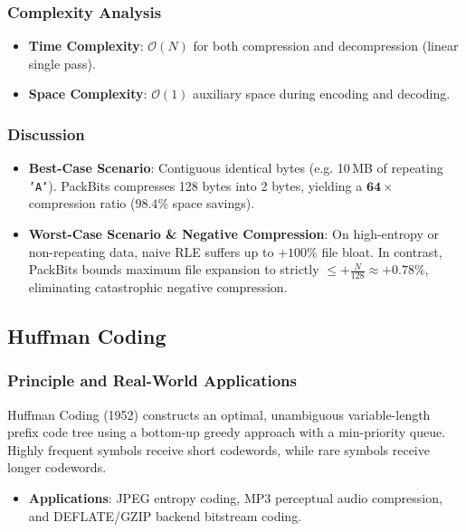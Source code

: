 \documentclass[12pt,a4paper]{article}
\begin{document}
\subsubsection{Complexity Analysis}
\begin{itemize}
    \item \textbf{Time Complexity}: $\mathcal{O}(N)$ for both compression and decompression (linear single pass).
    \item \textbf{Space Complexity}: $\mathcal{O}(1)$ auxiliary space during encoding and decoding.
\end{itemize}

\subsubsection{Discussion}
\begin{itemize}
    \item \textbf{Best-Case Scenario}: Contiguous identical bytes (e.g. 10\,MB of repeating \texttt{'A'}). PackBits compresses 128 bytes into 2 bytes, yielding a $\mathbf{64\times}$ compression ratio ($98.4\%$ space savings).
    \item \textbf{Worst-Case Scenario \& Negative Compression}: On high-entropy or non-repeating data, naive RLE suffers up to $+100\%$ file bloat. In contrast, PackBits bounds maximum file expansion to strictly $\le +\frac{N}{128} \approx +\mathbf{0.78\%}$, eliminating catastrophic negative compression.
\end{itemize}

\subsection{Huffman Coding}

\subsubsection{Principle and Real-World Applications}
Huffman Coding (1952) constructs an optimal, unambiguous variable-length prefix code tree using a bottom-up greedy approach with a min-priority queue. Highly frequent symbols receive short codewords, while rare symbols receive longer codewords.
\begin{itemize}
    \item \textbf{Applications}: JPEG entropy coding, MP3 perceptual audio compression, and DEFLATE/GZIP backend bitstream coding.
\end{itemize}
\end{document}

